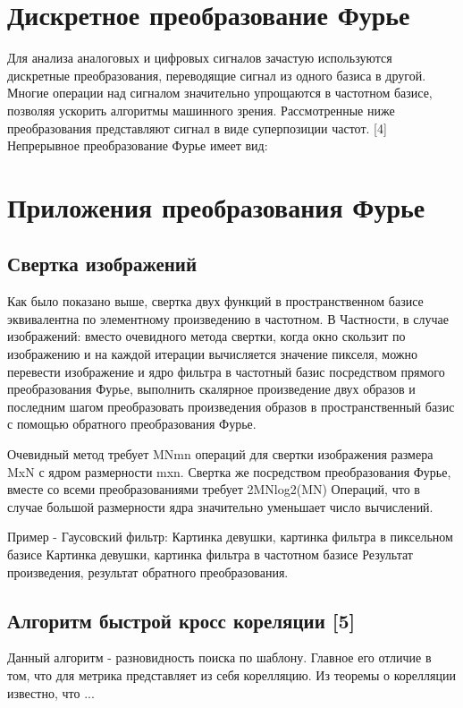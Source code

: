 \documentclass[oneside,final,14pt]{extreport}
\begin{document}
\chapter{Дискретное преобразование Фурье}
Для анализа аналоговых и цифровых сигналов зачастую используются дискретные преобразования, переводящие сигнал из одного базиса в другой. Многие операции над сигналом значительно упрощаются в частотном базисе, позволяя ускорить алгоритмы машинного зрения. Рассмотренные ниже преобразования представляют сигнал в виде суперпозиции частот. 
[4]
Непрерывное преобразование Фурье имеет вид:

\chapter{ Приложения преобразования Фурье }
\section{Свертка изображений}

Как было показано выше, свертка двух функций в пространственном базисе эквивалентна по элементному произведению в частотном. В Частности, в случае изображений: вместо очевидного метода свертки, когда окно скользит по изображению и на каждой итерации вычисляется значение пикселя, можно перевести изображение и ядро фильтра в частотный базис посредством прямого преобразования Фурье, выполнить скалярное произведение двух образов и последним шагом преобразовать произведения образов в пространственный базис с помощью обратного преобразования Фурье. 

Очевидный метод требует MNmn операций для свертки изображения размера MxN с ядром размерности mxn. Свертка же посредством преобразования Фурье, вместе со всеми преобразованиями требует 2MNlog2(MN) Операций, что в случае большой размерности ядра значительно уменьшает число вычислений. 

Пример - Гаусовский фильтр:
Картинка девушки, картинка фильтра в пиксельном базисе
Картинка девушки, картинка фильтра в частотном базисе
Результат произведения, результат обратного преобразования.

\section{Алгоритм быстрой  кросс кореляции [5]}
Данный алгоритм  - разновидность поиска по шаблону. Главное его отличие в том, что для метрика представляет из себя корелляцию. Из теоремы о корелляции известно, что ...  
\end{document}
